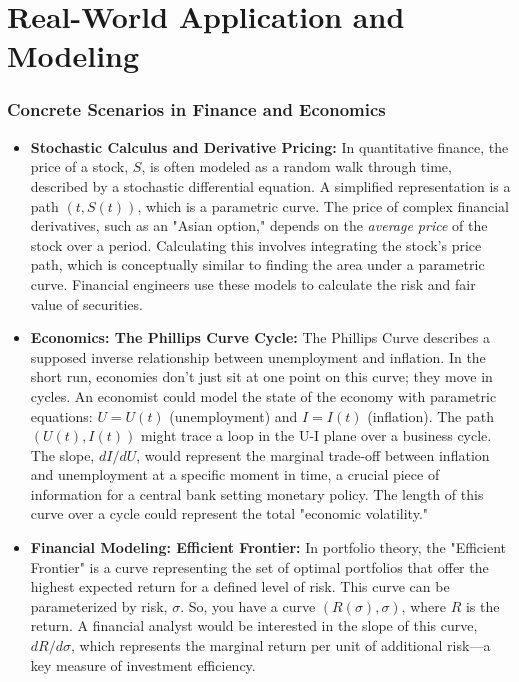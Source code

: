 \documentclass{article}
\begin{document}
\part{Real-World Application and Modeling}

\section{Concrete Scenarios in Finance and Economics}
\begin{itemize}
    \item \textbf{Stochastic Calculus and Derivative Pricing:} In quantitative finance, the price of a stock, $S$, is often modeled as a random walk through time, described by a stochastic differential equation. A simplified representation is a path $(t, S(t))$, which is a parametric curve. The price of complex financial derivatives, such as an "Asian option," depends on the \textit{average price} of the stock over a period. Calculating this involves integrating the stock's price path, which is conceptually similar to finding the area under a parametric curve. Financial engineers use these models to calculate the risk and fair value of securities.
    \item \textbf{Economics: The Phillips Curve Cycle:} The Phillips Curve describes a supposed inverse relationship between unemployment and inflation. In the short run, economies don't just sit at one point on this curve; they move in cycles. An economist could model the state of the economy with parametric equations: $U = U(t)$ (unemployment) and $I = I(t)$ (inflation). The path $(U(t), I(t))$ might trace a loop in the U-I plane over a business cycle. The slope, $dI/dU$, would represent the marginal trade-off between inflation and unemployment at a specific moment in time, a crucial piece of information for a central bank setting monetary policy. The length of this curve over a cycle could represent the total "economic volatility."
    \item \textbf{Financial Modeling: Efficient Frontier:} In portfolio theory, the "Efficient Frontier" is a curve representing the set of optimal portfolios that offer the highest expected return for a defined level of risk. This curve can be parameterized by risk, $\sigma$. So, you have a curve $(R(\sigma), \sigma)$, where $R$ is the return. A financial analyst would be interested in the slope of this curve, $dR/d\sigma$, which represents the marginal return per unit of additional risk—a key measure of investment efficiency.
\end{itemize}
\end{document}
